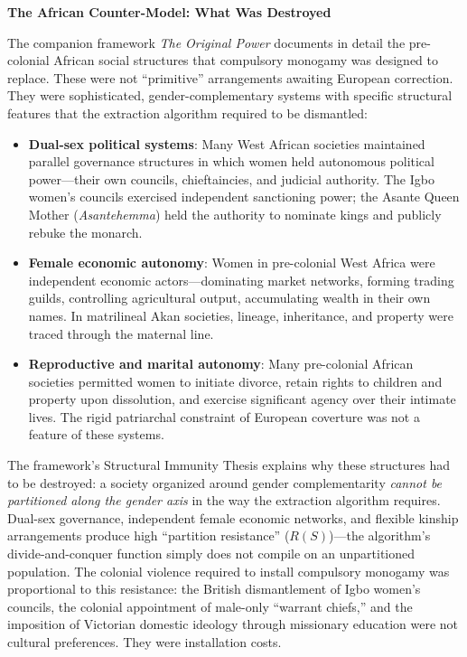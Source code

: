 \documentclass[12pt,openany]{book}
\numberwithin{equation}{chapter}
\begin{document}
\textbf{The African Counter-Model: What Was Destroyed}

The companion framework \textit{The Original Power} documents in detail the pre-colonial African social structures that compulsory monogamy was designed to replace. These were not ``primitive'' arrangements awaiting European correction. They were sophisticated, gender-complementary systems with specific structural features that the extraction algorithm required to be dismantled:

\begin{itemize}
    \item \textbf{Dual-sex political systems}: Many West African societies maintained parallel governance structures in which women held autonomous political power---their own councils, chieftaincies, and judicial authority. The Igbo women's councils exercised independent sanctioning power; the Asante Queen Mother (\textit{Asantehemma}) held the authority to nominate kings and publicly rebuke the monarch.
    
    \item \textbf{Female economic autonomy}: Women in pre-colonial West Africa were independent economic actors---dominating market networks, forming trading guilds, controlling agricultural output, accumulating wealth in their own names. In matrilineal Akan societies, lineage, inheritance, and property were traced through the maternal line.
    
    \item \textbf{Reproductive and marital autonomy}: Many pre-colonial African societies permitted women to initiate divorce, retain rights to children and property upon dissolution, and exercise significant agency over their intimate lives. The rigid patriarchal constraint of European coverture was not a feature of these systems.
\end{itemize}

The framework's Structural Immunity Thesis explains why these structures had to be destroyed: a society organized around gender complementarity \textit{cannot be partitioned along the gender axis} in the way the extraction algorithm requires. Dual-sex governance, independent female economic networks, and flexible kinship arrangements produce high ``partition resistance'' ($R(S)$)---the algorithm's divide-and-conquer function simply does not compile on an unpartitioned population. The colonial violence required to install compulsory monogamy was proportional to this resistance: the British dismantlement of Igbo women's councils, the colonial appointment of male-only ``warrant chiefs,'' and the imposition of Victorian domestic ideology through missionary education were not cultural preferences. They were installation costs.
\end{document}
